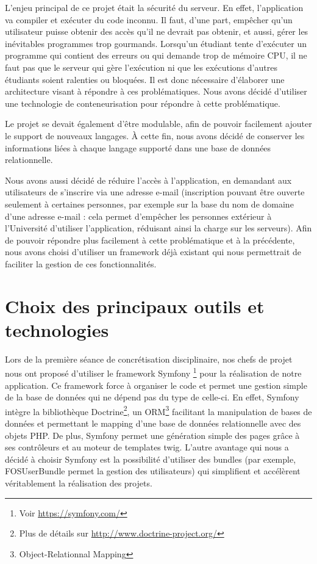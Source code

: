 \par L'enjeu principal de ce projet était la sécurité du serveur. En effet, l'application va compiler et exécuter du code inconnu. Il faut, d'une part, empêcher qu'un utilisateur puisse obtenir des accès qu'il ne devrait pas obtenir, et aussi, gérer les inévitables programmes trop gourmands. Lorsqu'un étudiant tente d'exécuter un programme qui contient des erreurs ou qui demande trop de mémoire CPU, il ne faut pas que le serveur qui gère l'exécution ni que les exécutions d'autres étudiants soient ralenties ou bloquées. Il est donc nécessaire d'élaborer une architecture visant à répondre à ces problématiques. Nous avons décidé d'utiliser une technologie de conteneurisation pour répondre à cette problématique.

\par Le projet se devait également d'être modulable, afin de pouvoir facilement ajouter le support de nouveaux langages. À cette fin, nous avons décidé de conserver les informations liées à chaque langage supporté dans une base de données relationnelle.

\par Nous avons aussi décidé de réduire l'accès à l'application, en demandant aux utilisateurs de s'inscrire via une adresse e-mail (inscription pouvant être ouverte seulement à certaines personnes, par exemple sur la base du nom de domaine d'une adresse e-mail : cela permet d'empêcher les personnes extérieur à l'Université d'utiliser l'application, réduisant ainsi la charge sur les serveurs). Afin de pouvoir répondre plus facilement à cette problématique et à la précédente, nous avons choisi d'utiliser un framework déjà existant qui nous permettrait de faciliter la gestion de ces fonctionnalités.

\section{Choix des principaux outils et technologies}
\label{sec-principaux-outils}
\par Lors de la première séance de concrétisation disciplinaire, nos chefs de projet nous ont proposé d'utiliser le framework Symfony \footnote{Voir \url{https://symfony.com/}} pour la réalisation de notre application. Ce framework force à organiser le code et permet une gestion simple de la base de données qui ne dépend pas du type de celle-ci. En effet, Symfony intègre la bibliothèque Doctrine\footnote{Plus de détails sur \url{http://www.doctrine-project.org/}}, un ORM\footnote{Object-Relationnal Mapping} facilitant la manipulation de bases de données et permettant le mapping d'une base de données relationnelle avec des objets PHP. De plus, Symfony permet une génération simple des pages grâce à ses contrôleurs et au moteur de templates twig. L'autre avantage qui nous a décidé à choisir Symfony est la possibilité d'utiliser des bundles (par exemple, FOSUserBundle permet la gestion des utilisateurs) qui simplifient et accélèrent véritablement la réalisation des projets. \\

